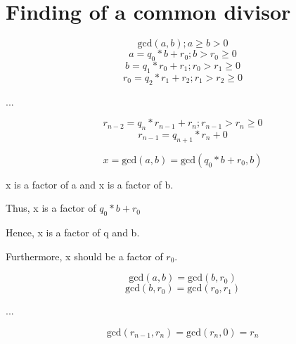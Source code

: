 \documentclass[a4paper]{article}
\begin{document}
	\section{Finding of a common divisor}
	\begin{equation*}
		\text{gcd}(a, b) ; a \geq b > 0
	\end{equation*}
	\begin{equation*}
		a = q_{0} * b + r_{0} ; b > r_{0} \geq 0
	\end{equation*}
	\begin{equation*}
		b = q_{1} * r_{0} + r_{1} ; r_{0} > r_{1} \geq 0
	\end{equation*}
	\begin{equation*}
		r_{0} = q_{2} * r_{1} + r_{2} ; r_{1} > r_{2} \geq 0
	\end{equation*}
	\begin{center}
		...
	\end{center}
	\begin{equation*}
		r_{n - 2} = q_{n} * r_{n - 1} + r_{n}; r_{n - 1} > r_{n} \geq 0
	\end{equation*}
	\begin{equation*}
		r_{n - 1} = q_{n + 1} * r_{n} + 0
	\end{equation*}
	
	\begin{equation*}
		x = \text{gcd}(a, b) = \text{gcd}(q_{0} * b + r_{0}, b)
	\end{equation*}
	\begin{center}
		x is a factor of a and x is a factor of b.
	\end{center}
	\begin{center}
		Thus, x is a factor of $q_{0} * b + r_{0}$
	\end{center}
	\begin{center}
		Hence, x is a factor of q and b.
	\end{center}
	\begin{center}
		Furthermore, x should be a factor of $r_{0}$.
	\end{center}
	\begin{equation*}
		\text{gcd}(a, b) = \text{gcd}(b, r_{0})
	\end{equation*}
	\begin{equation*}
		\text{gcd}(b, r_{0}) = \text{gcd}(r_{0}, r_{1})
	\end{equation*}
	\begin{center}
		...
	\end{center}
	\begin{equation*}
		\text{gcd}(r_{n - 1}, r_{n}) = \text{gcd}(r_{n}, 0) = r_{n}
	\end{equation*}
	
\end{document}
